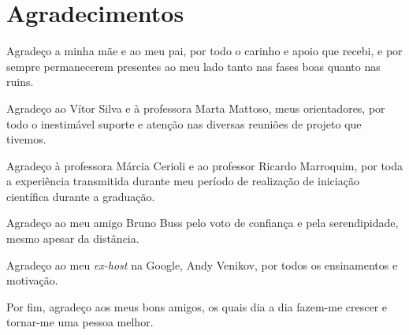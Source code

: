 
\dedication{Dedico esse trabalho aos meus pais, que sempre me apoiaram em tudo o que realizei.}

\chapter*{Agradecimentos}

Agradeço a minha mãe e ao meu pai, por todo o carinho e apoio que recebi, e por sempre permanecerem presentes ao meu lado tanto nas fases boas quanto nas ruins.

Agradeço ao Vítor Silva e à professora Marta Mattoso, meus orientadores, por todo o inestimável suporte e atenção nas diversas reuniões de projeto que tivemos.

Agradeço à professora Márcia Cerioli e ao professor Ricardo Marroquim, por toda a experiência transmitida durante meu período de realização de iniciação científica durante a graduação.

Agradeço ao meu amigo Bruno Buss pelo voto de confiança e pela serendipidade, mesmo apesar da distância.

Agradeço ao meu \textit{ex-host} na Google, Andy Venikov, por todos os ensinamentos e motivação.

Por fim, agradeço aos meus bons amigos, os quais dia a dia fazem-me crescer e tornar-me uma pessoa melhor.